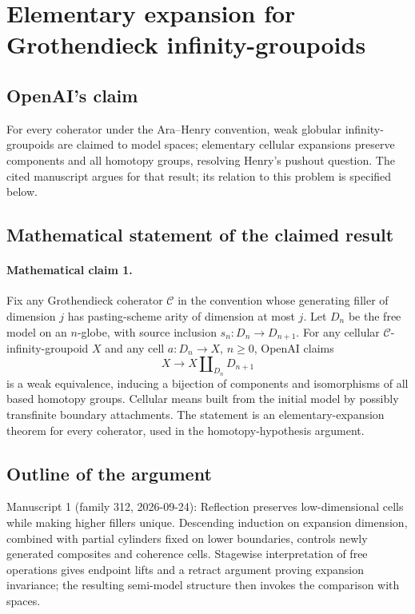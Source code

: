 \documentclass[11pt]{article}
\begin{document}
\section*{Elementary expansion for Grothendieck infinity-groupoids}

\subsection{OpenAI's claim}
For every coherator under the Ara--Henry convention, weak globular infinity-groupoids are claimed to model spaces; elementary cellular expansions preserve components and all homotopy groups, resolving Henry's pushout question. The cited manuscript argues for that result; its relation to this problem is specified below.

\subsection{Mathematical statement of the claimed result}
\paragraph{Mathematical claim 1.} Fix any Grothendieck coherator $\mathcal C$ in the convention whose generating filler of dimension $j$ has pasting-scheme arity of dimension at most $j$. Let $D_n$ be the free model on an $n$-globe, with source inclusion $s_n:D_n\to D_{n+1}$. For any cellular $\mathcal C$-infinity-groupoid $X$ and any cell $a:D_n\to X$, $n\ge0$, OpenAI claims
\[
X\longrightarrow X\amalg_{D_n}D_{n+1}
\]
is a weak equivalence, inducing a bijection of components and isomorphisms of all based homotopy groups. Cellular means built from the initial model by possibly transfinite boundary attachments. The statement is an elementary-expansion theorem for every coherator, used in the homotopy-hypothesis argument.

\subsection{Outline of the argument}
Manuscript 1 (family 312, 2026-09-24): Reflection preserves low-dimensional cells while making higher fillers unique. Descending induction on expansion dimension, combined with partial cylinders fixed on lower boundaries, controls newly generated composites and coherence cells. Stagewise interpretation of free operations gives endpoint lifts and a retract argument proving expansion invariance; the resulting semi-model structure then invokes the comparison with spaces.
\end{document}
